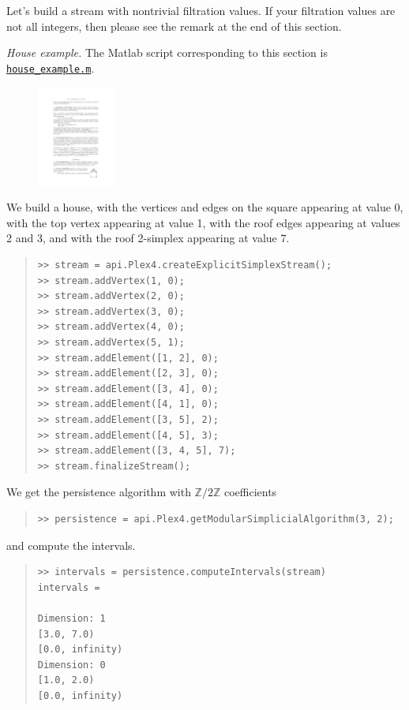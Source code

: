 \documentclass[amscd, amssymb, verbatim]{amsart}[12pt]
\theoremstyle{remark}
\theoremstyle{remark}
\theoremstyle{remark}
\newcommand{\Z}{\mathbb{Z}}
\begin{document}
Let's build a stream with nontrivial filtration values. If your filtration values are not all integers, then please see the remark at the end of this section.

{\em House example.} The Matlab script corresponding to this section is \href{https://github.com/appliedtopology/javaplex/tree/master/src/matlab/for_distribution/tutorial_examples/house_example.m}{\texttt{house\_example.m}}.

\begin{figure}
	\begin{center}
   	\includegraphics[width=1in]{houseFig.pdf}
  	\end{center}
\end{figure}

We build a house, with the vertices and edges on the square appearing at value 0, with the top vertex appearing at value 1, with the roof edges appearing at values 2 and 3, and with the roof 2-simplex appearing at value 7.

\begin{quote} \begin{verbatim}
>> stream = api.Plex4.createExplicitSimplexStream();
>> stream.addVertex(1, 0);
>> stream.addVertex(2, 0);
>> stream.addVertex(3, 0);
>> stream.addVertex(4, 0);
>> stream.addVertex(5, 1);
>> stream.addElement([1, 2], 0);
>> stream.addElement([2, 3], 0);
>> stream.addElement([3, 4], 0);
>> stream.addElement([4, 1], 0);
>> stream.addElement([3, 5], 2);
>> stream.addElement([4, 5], 3);
>> stream.addElement([3, 4, 5], 7);
>> stream.finalizeStream();
\end{verbatim} \end{quote}

We get the persistence algorithm with $\Z/2\Z$ coefficients
\begin{quote} \begin{verbatim}
>> persistence = api.Plex4.getModularSimplicialAlgorithm(3, 2);
\end{verbatim} \end{quote}

and compute the intervals.

\begin{quote} \begin{verbatim}
>> intervals = persistence.computeIntervals(stream)
intervals =

Dimension: 1
[3.0, 7.0)
[0.0, infinity)
Dimension: 0
[1.0, 2.0)
[0.0, infinity)
\end{verbatim} \end{quote}
\end{document}
